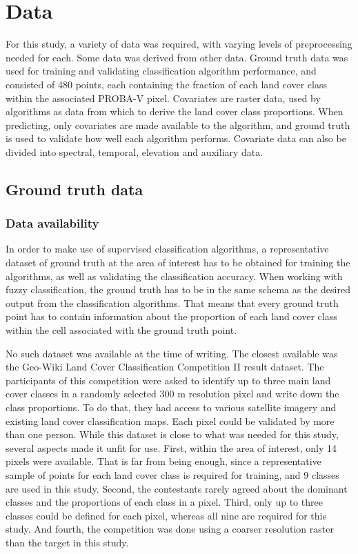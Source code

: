 \documentclass[a4paper,10pt]{book}
\begin{document}
\section{Data}

For this study, a variety of data was required, with varying levels of preprocessing needed for each. Some data was derived from other data. Ground truth data was used for training and validating classification algorithm performance, and consisted of 480 points, each containing the fraction of each land cover class within the associated PROBA-V pixel. Covariates are raster data, used by algorithms as data from which to derive the land cover class proportions. When predicting, only covariates are made available to the algorithm, and ground truth is used to validate how well each algorithm performs. Covariate data can also be divided into spectral, temporal, elevation and auxiliary data.

\subsection{Ground truth data}

\subsubsection{Data availability}

In order to make use of supervised classification algorithms, a representative dataset of ground truth at the area of interest has to be obtained for training the algorithms, as well as validating the classification accuracy. When working with fuzzy classification, the ground truth has to be in the same schema as the desired output from the classification algorithms. That means that every ground truth point has to contain information about the proportion of each land cover class within the cell associated with the ground truth point.

No such dataset was available at the time of writing. The closest available was the Geo-Wiki Land Cover Classification Competition II result dataset. The participants of this competition were asked to identify up to three main land cover classes in a randomly selected 300 m resolution pixel and write down the class proportions. To do that, they had access to various satellite imagery and existing land cover classification maps. Each pixel could be validated by more than one person. While this dataset is close to what was needed for this study, several aspects made it unfit for use. First, within the area of interest, only 14 pixels were available. That is far from being enough, since a representative sample of points for each land cover class is required for training, and 9 classes are used in this study. Second, the contestants rarely agreed about the dominant classes and the proportions of each class in a pixel. Third, only up to three classes could be defined for each pixel, whereas all nine are required for this study. And fourth, the competition was done using a coarser resolution raster than the target in this study.
\end{document}
